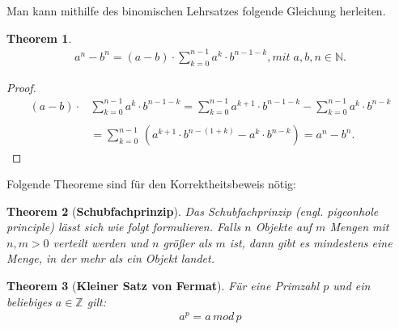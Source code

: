 \documentclass[12pt,oneside]{article}
\newtheorem{theorem}{Theorem}[section]
\theoremstyle{remark}
\theoremstyle{definition}
\begin{document}
\smallskip

Man kann mithilfe des binomischen Lehrsatzes folgende Gleichung herleiten.\newline

\begin{theorem}\label{funny_id}
\begin{align*}
a^{n} - b^n = (a - b) \cdot \sum_{k = 0}^{n - 1} a^{k} \cdot  b^{n - 1 - k}, mit \; a,b,n \in \mathbb{N}.
\end{align*} 
\end{theorem}

\begin{proof}
\begin{align*}
(a - b) \cdot &\sum_{k = 0}^{n - 1} a^{k} \cdot  b^{n - 1 - k} = \sum_{k = 0}^{n - 1} a^{k + 1}\cdot b^{n - 1 - k} - \sum_{k = 0}^{n - 1} a^k \cdot b^{n - k} \\
\\
&= \sum_{k = 0}^{n - 1} \, (a^{k + 1}\cdot b^{n - (1 + k)} -a^k \cdot b^{n - k}) = a^n - b^n.
\end{align*}
\end{proof}

\smallskip
Folgende Theoreme sind für den Korrektheitsbeweis nötig:\newline 
\begin{theorem}[\textbf{Schubfachprinzip}]\label{pigeonhole} Das Schubfachprinzip (engl. pigeonhole principle) lässt sich wie folgt formulieren.
Falls $n$ Objekte auf $m$ Mengen mit $n,m > 0$ verteilt werden und $n$ größer als $m$ ist, dann gibt es mindestens eine Menge, in der mehr als ein Objekt landet. 

\end{theorem}

\smallskip

\begin{theorem}[\textbf{Kleiner Satz von Fermat}]\label{Th_2}
Für eine Primzahl $p$ und ein beliebiges $a \in \mathbb{Z}$ gilt:
\begin{align*}
    a^p = a \, mod \, p
\end{align*}
\end{theorem}
\end{document}
